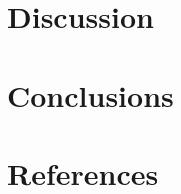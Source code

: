 \documentclass[11pt]{iopart}
\begin{document}
\section{Discussion}
\section{Conclusions}
\section{References}
\end{document}
